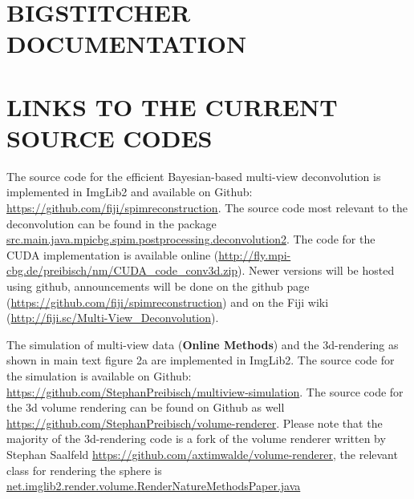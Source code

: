 \documentclass[]{spie}  %
\begin{document}
\pagebreak

\section{BIGSTITCHER DOCUMENTATION}
\label{sec:documentation}



\pagebreak

\section{LINKS TO THE CURRENT SOURCE CODES}
\label{sec:currentcode}

The source code for the efficient Bayesian-based multi-view deconvolution is implemented in ImgLib2\cite{PietzschAl12} and available on Github: \url{https://github.com/fiji/spimreconstruction}. The source code most relevant to the deconvolution can be found in the package \url{src.main.java.mpicbg.spim.postprocessing.deconvolution2}. The code for the CUDA implementation is available online (\url{http://fly.mpi-cbg.de/preibisch/nm/CUDA_code_conv3d.zip}). Newer versions will be hosted using github, announcements will be done on the github page (\url{https://github.com/fiji/spimreconstruction}) and on the Fiji wiki (\url{http://fiji.sc/Multi-View_Deconvolution}).

The simulation of multi-view data (\textbf{Online Methods}) and the 3d-rendering as shown in main text figure 2a are implemented in ImgLib2\cite{PietzschAl12}. The source code for the simulation is available on Github: \url{https://github.com/StephanPreibisch/multiview-simulation}. The source code for the 3d volume rendering can be found on Github as well \url{https://github.com/StephanPreibisch/volume-renderer}. Please note that the majority of the 3d-rendering code is a fork of the volume renderer written by Stephan Saalfeld \url{https://github.com/axtimwalde/volume-renderer}, the relevant class for rendering the sphere is \url{net.imglib2.render.volume.RenderNatureMethodsPaper.java}


\end{document}

